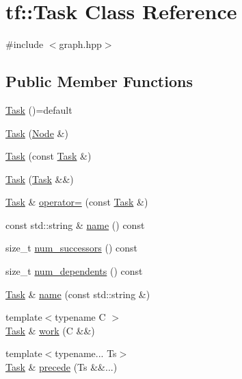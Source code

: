 \hypertarget{classtf_1_1Task}{}\section{tf\+:\+:Task Class Reference}
\label{classtf_1_1Task}


{\ttfamily \#include $<$graph.\+hpp$>$}

\subsection*{Public Member Functions}
\begin{DoxyCompactItemize}
\item 
\hyperlink{classtf_1_1Task_a5ed7ba63e8eeaa0f21fe08c80aa474ba}{Task} ()=default
\item 
\hyperlink{classtf_1_1Task_ac23878fa7fd15b212e80bcb51e69ce51}{Task} (\hyperlink{classtf_1_1Node}{Node} \&)
\item 
\hyperlink{classtf_1_1Task_a46a1b01af926c0fa699c831073b45f1c}{Task} (const \hyperlink{classtf_1_1Task}{Task} \&)
\item 
\hyperlink{classtf_1_1Task_a4783415f1b49195d34d94def88db5414}{Task} (\hyperlink{classtf_1_1Task}{Task} \&\&)
\item 
\hyperlink{classtf_1_1Task}{Task} \& \hyperlink{classtf_1_1Task_aebdcc47e47a119f261daab673a971458}{operator=} (const \hyperlink{classtf_1_1Task}{Task} \&)
\item 
const std\+::string \& \hyperlink{classtf_1_1Task_a08ada0425b490997b6ff7f310107e5e3}{name} () const
\item 
size\+\_\+t \hyperlink{classtf_1_1Task_a1a0afc89e8a6a416c511e74d82df135d}{num\+\_\+successors} () const
\item 
size\+\_\+t \hyperlink{classtf_1_1Task_a974dc1d738b62b829ad261beeafbd67c}{num\+\_\+dependents} () const
\item 
\hyperlink{classtf_1_1Task}{Task} \& \hyperlink{classtf_1_1Task_a2d3d62a1809d708137763db8e2a8dde8}{name} (const std\+::string \&)
\item 
{\footnotesize template$<$typename C $>$ }\\\hyperlink{classtf_1_1Task}{Task} \& \hyperlink{classtf_1_1Task_a085349bd9ad5066579ce450c7bc78406}{work} (C \&\&)
\item 
{\footnotesize template$<$typename... Ts$>$ }\\\hyperlink{classtf_1_1Task}{Task} \& \hyperlink{classtf_1_1Task_a119a34cce8c92e359f8ed31f2610d0ff}{precede} (Ts \&\&...)

\end{DoxyCompactItemize}
